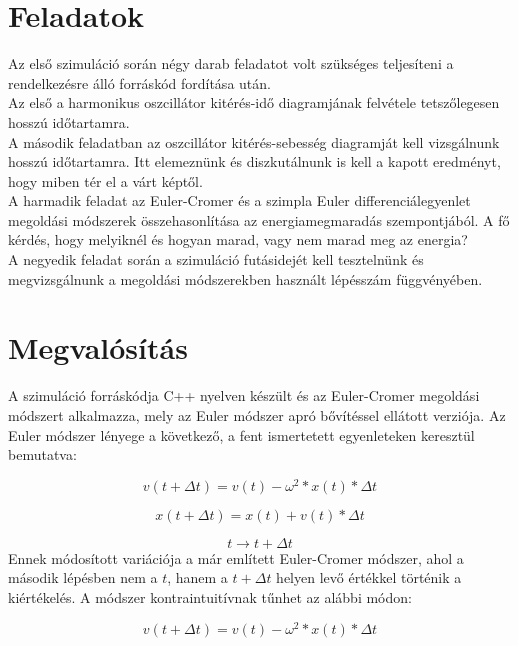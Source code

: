 \begin{multicols}{2}
\section{Feladatok} \label{sec:2}
Az első szimuláció során négy darab feladatot volt szükséges teljesíteni a rendelkezésre álló forráskód fordítása után. \\
Az első a harmonikus oszcillátor kitérés-idő diagramjának felvétele tetszőlegesen hosszú időtartamra. \\
A második feladatban az oszcillátor kitérés-sebesség diagramját kell vizsgálnunk hosszú időtartamra. Itt elemeznünk és diszkutálnunk is kell a kapott eredményt, hogy miben tér el a várt képtől. \\
A harmadik feladat az Euler-Cromer és a szimpla Euler differenciálegyenlet megoldási módszerek összehasonlítása az energiamegmaradás szempontjából. A fő kérdés, hogy melyiknél és hogyan marad, vagy nem marad meg az energia? \\
A negyedik feladat során a szimuláció futásidejét kell tesztelnünk és megvizsgálnunk a megoldási módszerekben használt lépésszám függvényében.

\section{Megvalósítás} \label{sec:3}
A szimuláció forráskódja C++ nyelven készült és az Euler-Cromer megoldási módszert alkalmazza, mely az Euler módszer apró bővítéssel ellátott verziója. Az Euler módszer lényege a következő, a fent ismertetett egyenleteken keresztül bemutatva\cite{csabaidiff}:

\begin{equation}
    v \left(t + \Delta t \right) = v \left( t \right) - \omega^{2} * x \left( t \right) * \Delta t
\end{equation}

\begin{equation}
    x \left(t + \Delta t \right) = x \left( t \right) + v \left( t \right) * \Delta t
\end{equation}

\begin{equation}
    t \to t + \Delta t
\end{equation}
Ennek módosított variációja a már említett Euler-Cromer módszer, ahol a második lépésben nem a $t$, hanem a $t + \Delta t$ helyen levő értékkel történik a kiértékelés. A módszer kontraintuitívnak tűnhet az alábbi módon:

\begin{equation}
    v \left(t + \Delta t \right) = v \left( t \right) - \omega^{2} * x \left( t \right) * \Delta t
\end{equation}


\end{multicols}
